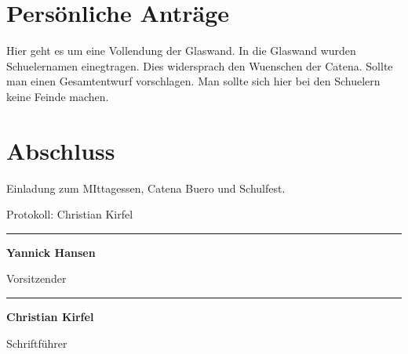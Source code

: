 \documentclass[a4paper, 11pt]{article}
\newcommand\signature[2]{%
\noindent\begin{minipage}{5cm}
    \noindent\vspace{3cm}\par
    \noindent\rule{5cm}{1pt}\par
    \noindent\textbf{#1}\par
    \noindent#2%
\end{minipage}}
\begin{document}
\section*{Persönliche Anträge}

Hier geht es um eine Vollendung der Glaswand.
In die Glaswand wurden Schuelernamen einegtragen.
Dies widersprach den Wuenschen der Catena.
Sollte man einen Gesamtentwurf vorschlagen.
Man sollte sich hier bei den Schuelern keine Feinde machen.

\section*{Abschluss}

Einladung zum MIttagessen, Catena Buero und Schulfest.

\newpage

Protokoll: Christian Kirfel


\signature{Yannick Hansen}{Vorsitzender}\hfill\signature{Christian Kirfel}{Schriftführer}
\end{document}
